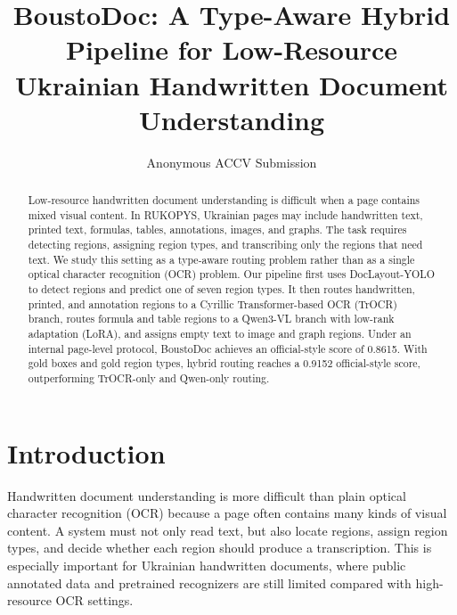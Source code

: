 \documentclass[runningheads]{llncs}
\begin{document}
\title{BoustoDoc: A Type-Aware Hybrid Pipeline for Low-Resource Ukrainian Handwritten Document Understanding}

\author{Anonymous ACCV Submission}

\maketitle

\begin{abstract}
Low-resource handwritten document understanding is difficult when a page contains mixed visual content. In RUKOPYS, Ukrainian pages may include handwritten text, printed text, formulas, tables, annotations, images, and graphs. The task requires detecting regions, assigning region types, and transcribing only the regions that need text. We study this setting as a type-aware routing problem rather than as a single optical character recognition (OCR) problem. Our pipeline first uses DocLayout-YOLO to detect regions and predict one of seven region types. It then routes handwritten, printed, and annotation regions to a Cyrillic Transformer-based OCR (TrOCR) branch, routes formula and table regions to a Qwen3-VL branch with low-rank adaptation (LoRA), and assigns empty text to image and graph regions. Under an internal page-level protocol, BoustoDoc achieves an official-style score of 0.8615. With gold boxes and gold region types, hybrid routing reaches a 0.9152 official-style score, outperforming TrOCR-only and Qwen-only routing.
\end{abstract}

\section{Introduction}
\label{sec:intro}

Handwritten document understanding is more difficult than plain optical character recognition (OCR) because a page often contains many kinds of visual content. A system must not only read text, but also locate regions, assign region types, and decide whether each region should produce a transcription. This is especially important for Ukrainian handwritten documents, where public annotated data and pretrained recognizers are still limited compared with high-resource OCR settings.
\end{document}
